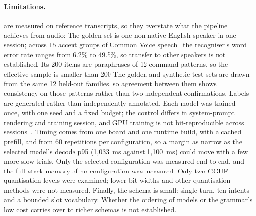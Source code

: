 \documentclass[a4paper,fleqn]{cas-dc}
\begin{document}
\paragraph{Limitations.}  are measured on reference transcripts, so they
overstate what the pipeline achieves from audio:  The golden set is one non-native English speaker in one session; across 15 accent groups of Common Voice speech~\citep{commonvoice} the recogniser's word error rate ranges from 6.2\% to 49.5\%, so transfer to other speakers is not established. Its 200 items are paraphrases
of 12 command patterns, so the effective sample is smaller than 200 The golden and synthetic test sets are drawn from the same 12 held-out
families, so agreement between them shows consistency on those patterns rather than two
independent confirmations. Labels are generated rather than independently annotated. Each model was trained once,
with one seed and a fixed budget; the control differs in system-prompt rendering and training
session, and GPU training is not bit-reproducible across sessions~\citep{pytorchrepro}. Timing comes
from one board and one runtime build, with a cached prefill, and from 60 repetitions per configuration, so a margin as narrow as the selected model's decode p95 (1,033~ms against 1,100~ms) could move with a few more slow trials. Only the selected configuration was
measured end to end, and the full-stack memory of no configuration was measured. Only two GGUF quantisation levels were examined; lower bit widths and other quantisation methods were not measured. Finally, the
schema is small: single-turn, ten intents and a bounded slot vocabulary. Whether the ordering of
models or the grammar's low cost carries over to richer schemas is not established.
\end{document}
